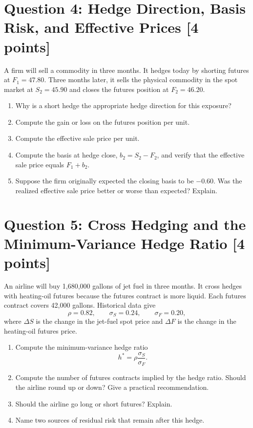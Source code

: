 \documentclass[11pt]{article}
\newcommand{\pts}[1]{\hspace{0.35em}\textnormal{\textbf{[#1 points]}}}
\newcommand{\Fone}{F_1}
\newcommand{\Ftwo}{F_2}
\begin{document}
\section*{Question 4: Hedge Direction, Basis Risk, and Effective Prices \pts{4}}

A firm will sell a commodity in three months. It hedges today by shorting futures
at $\Fone=47.80$. Three months later, it sells the physical commodity in the spot
market at $S_2=45.90$ and closes the futures position at $\Ftwo=46.20$.

\begin{enumerate}
    \item Why is a short hedge the appropriate hedge direction for this exposure?
    \item Compute the gain or loss on the futures position per unit.
    \item Compute the effective sale price per unit.
    \item Compute the basis at hedge close, $b_2=S_2-\Ftwo$, and verify that the
    effective sale price equals $\Fone+b_2$.
    \item Suppose the firm originally expected the closing basis to be $-0.60$.
    Was the realized effective sale price better or worse than expected? Explain.
\end{enumerate}

\section*{Question 5: Cross Hedging and the Minimum-Variance Hedge Ratio \pts{4}}

An airline will buy 1,680,000 gallons of jet fuel in three months. It cross
hedges with heating-oil futures because the futures contract is more liquid.
Each futures contract covers 42,000 gallons. Historical data give
\[
    \rho=0.82,\qquad \sigma_S=0.24,\qquad \sigma_F=0.20,
\]
where $\Delta S$ is the change in the jet-fuel spot price and $\Delta F$ is the
change in the heating-oil futures price.

\begin{enumerate}
    \item Compute the minimum-variance hedge ratio
    \[
        h^*=\rho\frac{\sigma_S}{\sigma_F}.
    \]
    \item Compute the number of futures contracts implied by the hedge ratio.
    Should the airline round up or down? Give a practical recommendation.
    \item Should the airline go long or short futures? Explain.
    \item Name two sources of residual risk that remain after this hedge.
\end{enumerate}
\end{document}
